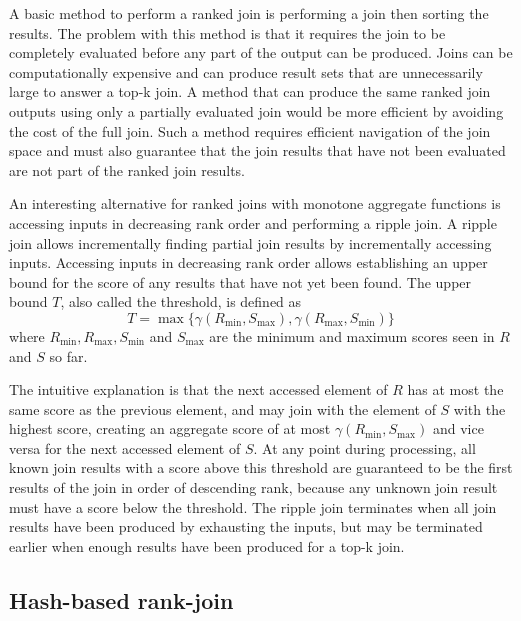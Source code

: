 A basic method to perform a ranked join is performing a join then sorting the results. The problem with this method is that it requires the join to be completely evaluated before any part of the output can be produced. Joins can be computationally expensive and can produce result sets that are unnecessarily large to answer a top-k join. A method that can produce the same ranked join outputs using only a partially evaluated join would be more efficient by avoiding the cost of the full join. Such a method requires efficient navigation of the join space and must also guarantee that the join results that have not been evaluated are not part of the ranked join results.

An interesting alternative for ranked joins with monotone aggregate functions is accessing inputs in decreasing rank order and performing a ripple join. A ripple join allows incrementally finding partial join results by incrementally accessing inputs. Accessing inputs in decreasing rank order allows establishing an upper bound for the score of any results that have not yet been found. The upper bound \(T\), also called the threshold, is defined as
\[
  T = \max\{\gamma(R_{\min}, S_{\max}), \gamma(R_{\max}, S_{\min})\}
\]
where \(R_{\min}, R_{\max}, S_{\min}\) and \(S_{\max}\) are the minimum and maximum scores seen in \(R\) and \(S\) so far.

The intuitive explanation is that the next accessed element of \(R\) has at most the same score as the previous element, and may join with the element of \(S\) with the highest score, creating an aggregate score of at most \(\gamma(R_{\min}, S_{\max})\) and vice versa for the next accessed element of \(S\). At any point during processing, all known join results with a score above this threshold are guaranteed to be the first results of the join in order of descending rank, because any unknown join result must have a score below the threshold. The ripple join terminates when all join results have been produced by exhausting the inputs, but may be terminated earlier when enough results have been produced for a top-k join.

\subsection{Hash-based rank-join}

